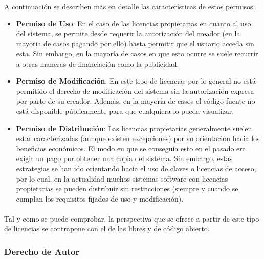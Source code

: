 \documentclass[10pt]{article}
\begin{document}
            \paragraph{}
            A continuación se describen más en detalle las características de estos permisos:
            \begin{itemize}
            	\item \textbf{Permiso de Uso}: En el caso de las licencias propietarias en cuanto al uso del sistema, se permite desde requerir la autorización del creador (en la mayoría de casos pagando por ello) hasta permitir que el usuario acceda sin esta. Sin embargo, en la mayoría de casos en que esto ocurre se suele recurrir a otras maneras de financiación como la publicidad.

            	\item \textbf{Permiso de Modificación}: En este tipo de licencias por lo general no está permitido el derecho de modificación del sistema sin la autorización expresa por parte de su creador. Además, en la mayoría de casos el código fuente no está disponible públicamente para que cualquiera lo pueda visualizar.

            	\item \textbf{Permiso de Distribución}: Las licencias propietarias  generalmente suelen estar caracterizadas (aunque existen excepciones) por su orientación hacia los beneficios económicos. El modo en que se conseguía esto en el pasado era exigir un pago por obtener una copia del sistema. Sin embargo, estas estrategias se han ido orientando hacia el uso de claves o licencias de acceso, por lo cual, en la actualidad muchos sistemas software con licencias propietarias se pueden distribuir sin restricciones (siempre y cuando se cumplan los requisitos fijados de uso y modificación). 

            \end{itemize}
            
            \paragraph{}
			Tal y como se puede comprobar, la perspectiva que se ofrece a partir de este tipo de licencias se contrapone con el de las libres y de código abierto.
			
            \subsubsection{Derecho de Autor}
            
\end{document}
